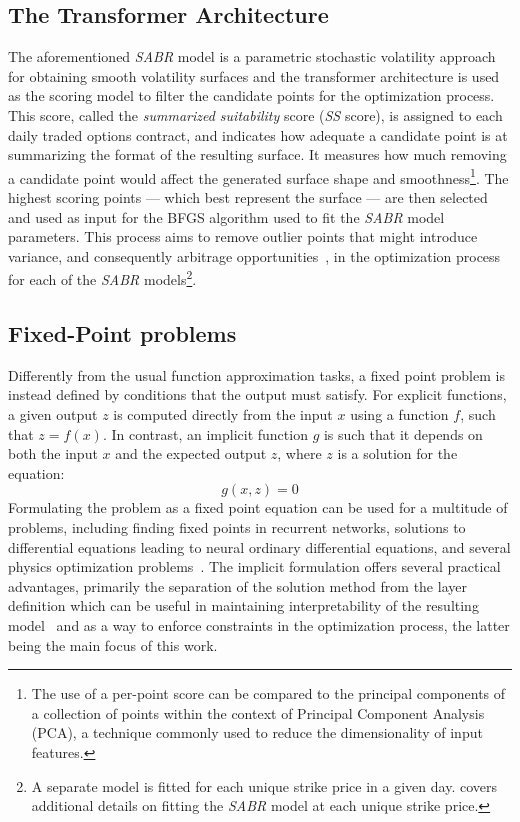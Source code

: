 \subsection{The Transformer Architecture}
\label{subsec:transformer}
The aforementioned \textit{SABR} model is a parametric stochastic volatility approach for obtaining smooth volatility surfaces and
the transformer architecture is used as the scoring model to filter the candidate points for the optimization process.
This score, called the \textit{summarized suitability} score (\textit{SS} score), is assigned to each daily traded options contract,
and indicates how adequate a candidate point is at summarizing the format of the resulting surface.
It measures how much removing a candidate point would affect the generated surface shape and smoothness\footnote{
    The use of a per-point score can be compared to the principal components of
    a collection of points within the context of Principal Component Analysis (PCA),
    a technique commonly used to reduce the dimensionality of input features.
}.
The highest scoring points --- which best represent the surface ---
are then selected and used as input for the BFGS algorithm used to fit the \textit{SABR} model parameters.
This process aims to remove outlier points that might introduce variance, and consequently arbitrage opportunities~\citep{Kim2021},
in the optimization process for each of the \textit{SABR} models\footnote{
    A separate model is fitted for each unique strike price in a given day.
     covers additional details on fitting the \textit{SABR} model at each unique strike price.
}.

\subsection{Fixed-Point problems}
\label{subsec:implicit}

Differently from the usual function approximation tasks, a fixed point problem is instead defined by conditions that the output must satisfy.
For explicit functions, a given output $z$ is computed directly from the input $x$ using a function $f$, such that $z = f(x)$.
In contrast, an implicit function  $g$ is such that it depends on both the input $x$ and the expected output $z$,
where $z$ is a solution for the equation:
\begin{equation}
    \label{eq:fixed_point}
    g(x, z) = 0
\end{equation}
Formulating the problem as a fixed point equation can be used for a multitude of problems,
including finding fixed points in recurrent networks,
solutions to differential equations leading to neural ordinary differential equations,
and several physics optimization problems~\citep{Chen2019}.
The implicit formulation offers several practical advantages, primarily the separation of the solution method from the layer
definition which can be useful in maintaining interpretability of the resulting model~\citep{Kawaguchi2021} and
as a way to enforce constraints in the optimization process, the latter being the main focus of this work.

